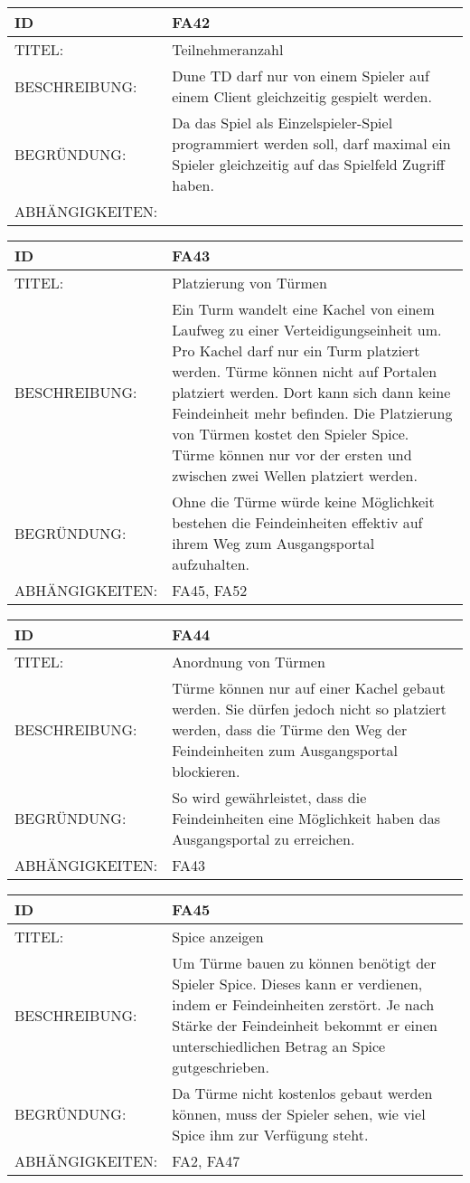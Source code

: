 \documentclass{uulm-assignment}
\begin{document}
\begin{tabularx}{16cm}{l|X}
\textbf{ID} & \textbf{FA42} \\
\hline
TITEL: & Teilnehmeranzahl \\ 
\hline
BESCHREIBUNG: & Dune TD darf nur von einem Spieler auf einem Client gleichzeitig gespielt werden. 
\\
\hline
BEGRÜNDUNG: & Da das Spiel als Einzelspieler-Spiel programmiert werden soll, darf maximal ein Spieler gleichzeitig auf das Spielfeld Zugriff haben. \\
\hline
ABHÄNGIGKEITEN: & \\
\end{tabularx}

\begin{tabularx}{16cm}{l|X}
\textbf{ID} & \textbf{FA43} \\
\hline
TITEL: & Platzierung von Türmen\\
\hline
BESCHREIBUNG: & Ein Turm wandelt eine Kachel von einem Laufweg zu einer Verteidigungseinheit um. Pro Kachel darf nur ein Turm platziert werden. Türme können nicht auf Portalen platziert werden. Dort kann sich dann keine Feindeinheit mehr befinden. Die Platzierung von Türmen kostet den Spieler Spice. Türme können nur vor der ersten und zwischen zwei Wellen platziert werden.
\\ 
\hline
BEGRÜNDUNG: & Ohne die Türme würde keine Möglichkeit bestehen die Feindeinheiten effektiv auf ihrem Weg zum Ausgangsportal aufzuhalten. \\ 
\hline
ABHÄNGIGKEITEN: & FA45, FA52\\
\end{tabularx}

\begin{tabularx}{16cm}{l|X}
\textbf{ID} & \textbf{FA44} \\
\hline
TITEL: & Anordnung von Türmen \\
\hline
BESCHREIBUNG: & Türme können nur auf einer Kachel gebaut werden. Sie dürfen jedoch nicht so platziert werden, dass die Türme den Weg der Feindeinheiten zum Ausgangsportal blockieren.
\\
\hline
BEGRÜNDUNG: & So wird gewährleistet, dass die Feindeinheiten eine Möglichkeit haben das Ausgangsportal zu erreichen. \\
\hline
ABHÄNGIGKEITEN: & FA43 \\ 
\end{tabularx}

\begin{tabularx}{16cm}{l|X}
\textbf{ID} & \textbf{FA45} \\
\hline
TITEL: & Spice anzeigen \\ 
\hline
BESCHREIBUNG: & Um Türme bauen zu können benötigt der Spieler Spice. Dieses kann er verdienen, indem er Feindeinheiten zerstört. Je nach Stärke der Feindeinheit bekommt er einen unterschiedlichen Betrag an Spice gutgeschrieben.
\\
\hline
BEGRÜNDUNG: & Da Türme nicht kostenlos gebaut werden können, muss der Spieler sehen, wie viel Spice ihm zur Verfügung steht. \\
\hline
ABHÄNGIGKEITEN: & FA2, FA47\\ 
\end{tabularx}
\end{document}
